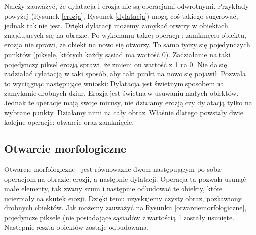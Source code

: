 \documentclass{article}
\begin{document}
        {
            \Large
            \justifying
            \quad
            Należy zauważyć, że dylatacja i erozja nie są operacjami odwrotnymi.
            Przykłady powyżej (Rysunek \ref{erozja}, Rysunek \ref{dylatacja}) mogą coś takiego sugerować, jednak tak nie jest.
            Dzięki dylatacji możemy zamykać otwory w obiektach znajdujących się na obrazie.
            Po wykonaniu takiej operacji i zamknięciu obiektu, erozja nie sprawi, że obiekt na nowo się otworzy.
            To samo tyczy się pojedynczych punktów (piksele, których każdy sąsiad ma wartość 0).
            Zadziałanie na taki pojedynczy piksel erozją sprawi, że zmieni on wartość z 1 na 0.
            Nie da się zadziałać dylatacją w taki sposób, aby taki punkt na nowo się pojawił.
            Pozwala to wyciągnąc następujące wnioski:
            Dylatacja jest świetnym sposobem na zamykanie drobnych dziur.
            Erozja jest świetna w usuwaniu małych obiektów.
            Jednak te operacje mają swoje minusy, nie działamy erozją czy dylatacją tylko na wybrane punkty.
            Działamy nimi na cały obraz.
            Właśnie dlatego powstały dwie kolejne operacje: otwarcie oraz zamknięcie.
        }

        \newpage
        \subsection{Otwarcie morfologiczne}
        {
            \label{sec:otwarcie-morfologiczne}
            \Large
            \justifying
            \quad
            Otwarcie morfologiczne - jest równoważne dwom następującym po sobie operacjom na obrazie: erozji, a następnie dylatacji.
            Operacja ta pozwala usunąć małe elementy, tak zwany szum i następnie odbudować te obiekty, które ucierpiały na skutek erozji.
            Dzięki temu uzyskujemy czysty obraz, pozbawiony drobnych obiektów.
            Jak możemy zauważyć na Rysunku \ref{otwarciemorfologiczne}, pojedyncze piksele (nie posiadające sąsiadów z wartością 1 zostały usunięte.
            Następnie reszta obiektów zostaje odbudowana.
        }
\end{document}
